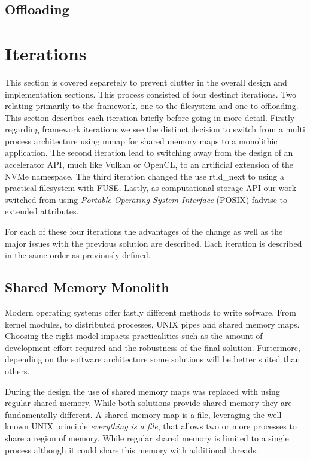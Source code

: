 \subsection{Offloading}


\section{Iterations}

This section is covered separetely to prevent clutter in the overall design and
implementation sections. This process consisted of four destinct iterations.
Two relating primarily to the framework, one to the filesystem and one to
offloading. This section describes each iteration briefly before going in more
detail. Firstly regarding framework iterations we see the distinct decision
to switch from a multi process architecture using mmap for shared memory maps to
a monolithic application. The second iteration lead to switching away from the
design of an accelerator API, much like Vulkan \cite{vulkan} or OpenCL, to an
artificial extension of the NVMe namespace. The third iteration changed the use
rtld\_next \cite{rtldnext} to using a practical filesystem with FUSE. Lastly, as
computational storage API our work switched from using
\textit{Portable Operating System Interface} (POSIX) fadvise \cite{fadvise} to
extended attributes.

For each of these four iterations the advantages of the change as well as the
major issues with the previous solution are described. Each iteration is
described in the same order as previously defined.

\subsection{Shared Memory Monolith}

Modern operating systems offer fastly different methods to write sofware. From
kernel modules, to distributed processes, UNIX pipes and shared memory maps.
Choosing the right model impacts practicalities such as the amount of
development effort required and the robustness of the final solution. 
Furtermore, depending on the software architecture some solutions will be better
suited than others.

During the design the use of shared memory maps was replaced with using regular
shared memory. While both solutions provide shared memory they are fundamentally
different. A shared memory map is a file, leveraging the well known UNIX
principle \textit{everything is a file}, that allows two or more processes to
share a region of memory. While regular shared memory is limited to a single
process although it could share this memory with additional threads.


